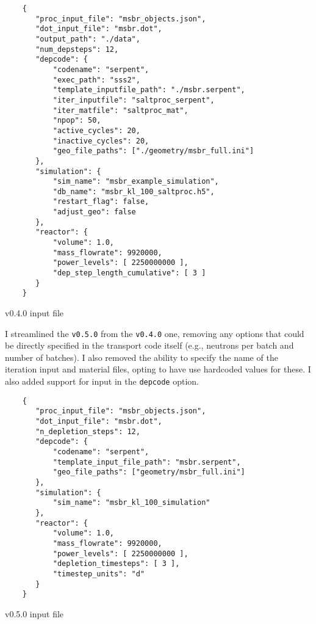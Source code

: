 \begin{listing}[!ht]
    \begin{verbatim}
    {
       "proc_input_file": "msbr_objects.json",
       "dot_input_file": "msbr.dot",
       "output_path": "./data",
       "num_depsteps": 12,
       "depcode": {
           "codename": "serpent",
           "exec_path": "sss2",
           "template_inputfile_path": "./msbr.serpent",
           "iter_inputfile": "saltproc_serpent",
           "iter_matfile": "saltproc_mat",
           "npop": 50,
           "active_cycles": 20,
           "inactive_cycles": 20,
           "geo_file_paths": ["./geometry/msbr_full.ini"]
       },
       "simulation": {
           "sim_name": "msbr_example_simulation",
           "db_name": "msbr_kl_100_saltproc.h5",
           "restart_flag": false,
           "adjust_geo": false
       },
       "reactor": {
           "volume": 1.0,
           "mass_flowrate": 9920000,
           "power_levels": [ 2250000000 ],
           "dep_step_length_cumulative": [ 3 ]
       }
    }
    \end{verbatim}
    \caption{\SaltProc v0.4.0 input file}
    \label{code:input-2}
\end{listing}

I streamlined the \SaltProc \verb,v0.5.0, from the \verb,v0.4.0, one,
removing any options that could be directly specified in the transport code
itself (e.g., neutrons per batch and number of batches). I also removed the
ability to specify the name of the iteration input and material files, opting to
have \SaltProc use hardcoded values for these. I also added support for
\OpenMC input in the \verb.depcode. option.

\begin{listing}[!ht]
    \begin{verbatim}
    {
       "proc_input_file": "msbr_objects.json",
       "dot_input_file": "msbr.dot",
       "n_depletion_steps": 12,
       "depcode": {
           "codename": "serpent",
           "template_input_file_path": "msbr.serpent",
           "geo_file_paths": ["geometry/msbr_full.ini"]
       },
       "simulation": {
           "sim_name": "msbr_kl_100_simulation"
       },
       "reactor": {
           "volume": 1.0,
           "mass_flowrate": 9920000,
           "power_levels": [ 2250000000 ],
           "depletion_timesteps": [ 3 ],
           "timestep_units": "d"
       }
    }
    \end{verbatim}
    \caption{\SaltProc v0.5.0 input file}
    \label{code:input-3}
\end{listing}
